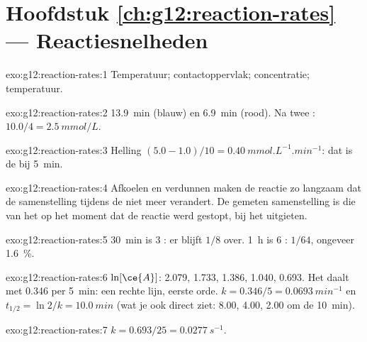 \section*{Hoofdstuk \ref{ch:g12:reaction-rates} --- Reactiesnelheden}

\begin{solution}{exo:g12:reaction-rates:1}
Temperatuur; contactoppervlak; concentratie; temperatuur.
\end{solution}

\begin{solution}{exo:g12:reaction-rates:2}
\qty{13.9}{min} (blauw) en \qty{6.9}{min} (rood). Na twee
: $10.0 / 4 = \qty{2.5}{mmol/L}$.
\end{solution}

\begin{solution}{exo:g12:reaction-rates:3}
Helling $(5.0 - 1.0)/10 = \qty{0.40}{mmol.L^{-1}.min^{-1}}$: dat is de
 bij \qty{5}{min}.
\end{solution}

\begin{solution}{exo:g12:reaction-rates:4}
Afkoelen en verdunnen maken de reactie zo langzaam dat de samenstelling
tijdens de  niet meer verandert. De gemeten samenstelling is die
van het  op het moment dat de reactie werd gestopt, bij het
uitgieten.
\end{solution}

\begin{solution}{exo:g12:reaction-rates:5}
\qty{30}{min} is 3 : er blijft $1/8$ over. \qty{1}{h} is
6 : $1/64$, ongeveer \qty{1.6}{\percent}.
\end{solution}

\begin{solution}{exo:g12:reaction-rates:6}
$\ln[\ce{A}]$: 2.079, 1.733, 1.386, 1.040, 0.693. Het daalt met 0.346 per
\qty{5}{min}: een rechte lijn, eerste orde. $k = 0.346/5 =
\qty{0.0693}{min^{-1}}$ en $t_{1/2} = \ln 2 / k = \qty{10.0}{min}$ (wat je
ook direct ziet: 8.00, 4.00, 2.00 om de \qty{10}{min}).
\end{solution}

\begin{solution}{exo:g12:reaction-rates:7}
$k = 0.693 / 25 = \qty{0.0277}{s^{-1}}$.
\end{solution}

